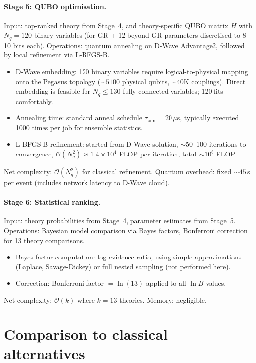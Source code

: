 \documentclass[11pt,a4paper, english]{book}
\theoremstyle{plain}
\theoremstyle{definition}
\numberwithin{equation}{chapter}
\numberwithin{figure}{chapter}
\numberwithin{table}{chapter}
\begin{document}
\paragraph{Stage 5: QUBO optimisation.}
Input: top-ranked theory from Stage~4, and theory-specific QUBO matrix $H$ 
with $N_q = 120$ binary variables (for GR + 12 beyond-GR parameters discretised 
to 8-10 bits each). Operations: quantum annealing on D-Wave Advantage2, followed 
by local refinement via L-BFGS-B.
\begin{itemize}
  \item D-Wave embedding: 120 binary variables require logical-to-physical mapping 
        onto the Pegasus topology ($\sim 5100$ physical qubits, $\sim 40$K couplings). 
        Direct embedding is feasible for $N_q \leq 130$ fully connected variables; 
        120 fits comfortably.
  \item Annealing time: standard anneal schedule $\tau_{\mathrm{ann}} = 20$\,$\mu$s, 
        typically executed 1000 times per job for ensemble statistics.
  \item L-BFGS-B refinement: started from D-Wave solution, $\sim 50$--100 iterations 
        to convergence, $\mathcal{O}(N_q^2) \approx 1.4 \times 10^4$ FLOP per iteration, 
        total $\sim 10^6$ FLOP.
\end{itemize}
Net complexity: $\mathcal{O}(N_q^2)$ for classical refinement. Quantum overhead: 
fixed $\sim 45$\,s per event (includes network latency to D-Wave cloud).

\paragraph{Stage 6: Statistical ranking.}
Input: theory probabilities from Stage~4, parameter estimates from Stage~5. 
Operations: Bayesian model comparison via Bayes factors, Bonferroni correction 
for 13 theory comparisons.
\begin{itemize}
  \item Bayes factor computation: log-evidence ratio, using simple approximations 
        (Laplace, Savage-Dickey) or full nested sampling (not performed here).
  \item Correction: Bonferroni factor $= \ln(13)$ applied to all $\ln B$ values.
\end{itemize}
Net complexity: $\mathcal{O}(k)$ where $k = 13$ theories. Memory: negligible.

\section{Comparison to classical alternatives}
\end{document}
